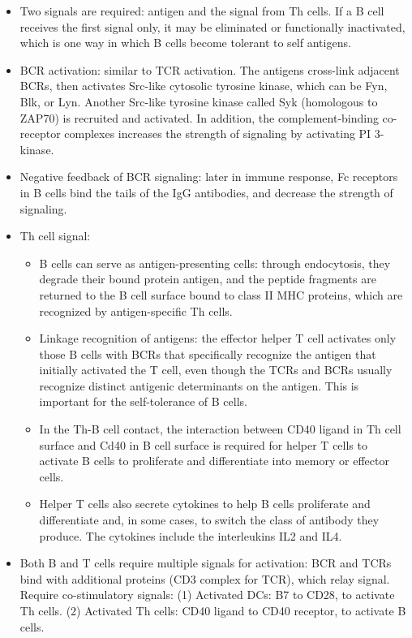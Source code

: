\documentclass{report}
\begin{document}
\begin{itemize}
\item Two signals are required: antigen and the signal from Th cells. If a B cell receives the first signal only, it may be eliminated or functionally inactivated, which is one way in which B cells become tolerant to self antigens.

\item BCR activation: similar to TCR activation. The antigens cross-link adjacent BCRs, then activates Src-like cytosolic tyrosine kinase, which can be Fyn, Blk, or Lyn. Another Src-like tyrosine kinase called Syk (homologous to ZAP70) is recruited and activated. In addition, the complement-binding co-receptor complexes increases the strength of signaling by activating PI 3-kinase. 

\item Negative feedback of BCR signaling: later in immune response, Fc receptors in B cells bind the tails of the IgG antibodies, and decrease the strength of signaling. 

\item Th cell signal: 
\begin{itemize}
	\item B cells can serve as antigen-presenting cells: through endocytosis, they degrade their bound protein antigen, and the peptide fragments are returned to the B cell surface bound to class II MHC proteins, which are recognized by antigen-specific Th cells. 
	\item Linkage recognition of antigens: the effector helper T cell activates only those B cells with BCRs that specifically recognize the antigen that initially activated the T cell, even though the TCRs and BCRs usually recognize distinct antigenic determinants on the antigen. This is important for the self-tolerance of B cells. 
	\item In the Th-B cell contact, the interaction between CD40 ligand in Th cell surface and Cd40 in B cell surface is required for helper T cells to activate B cells to proliferate and differentiate into memory or effector cells. 
	\item Helper T cells also secrete cytokines to help B cells proliferate and differentiate and, in some cases, to switch the class of antibody they produce. The cytokines include the interleukins IL2 and IL4.
\end{itemize}

\item Both B and T cells require multiple signals for activation: BCR and TCRs bind with additional proteins (CD3 complex for TCR), which relay signal. Require co-stimulatory signals: (1) Activated DCs: B7 to CD28, to activate Th cells. (2) Activated Th cells: CD40 ligand to CD40 receptor, to activate B cells. 

\end{itemize}
\end{document}

